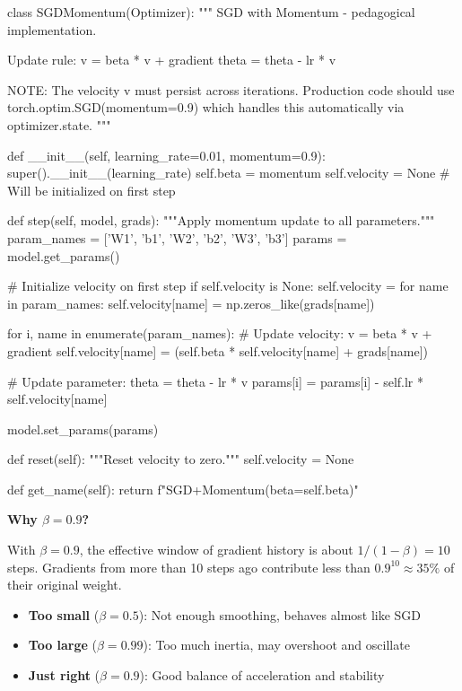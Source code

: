 \documentclass[../../main.tex]{subfiles}
\begin{document}
\begin{pythoncode}
class SGDMomentum(Optimizer):
    """
    SGD with Momentum - pedagogical implementation.

    Update rule:
        v = beta * v + gradient
        theta = theta - lr * v

    NOTE: The velocity v must persist across iterations.
    Production code should use torch.optim.SGD(momentum=0.9)
    which handles this automatically via optimizer.state.
    """

    def __init__(self, learning_rate=0.01, momentum=0.9):
        super().__init__(learning_rate)
        self.beta = momentum
        self.velocity = None  # Will be initialized on first step

    def step(self, model, grads):
        """Apply momentum update to all parameters."""
        param_names = ['W1', 'b1', 'W2', 'b2', 'W3', 'b3']
        params = model.get_params()

        # Initialize velocity on first step
        if self.velocity is None:
            self.velocity = {}
            for name in param_names:
                self.velocity[name] = np.zeros_like(grads[name])

        for i, name in enumerate(param_names):
            # Update velocity: v = beta * v + gradient
            self.velocity[name] = (self.beta * self.velocity[name] +
                                   grads[name])

            # Update parameter: theta = theta - lr * v
            params[i] = params[i] - self.lr * self.velocity[name]

        model.set_params(params)

    def reset(self):
        """Reset velocity to zero."""
        self.velocity = None

    def get_name(self):
        return f"SGD+Momentum(beta={self.beta})"
\end{pythoncode}

\begin{intuition}
\textbf{Why $\beta = 0.9$?}

With $\beta = 0.9$, the effective window of gradient history is about $1/(1-\beta) = 10$ steps. Gradients from more than 10 steps ago contribute less than $0.9^{10} \approx 35\%$ of their original weight.

\begin{itemize}
    \item \textbf{Too small} ($\beta = 0.5$): Not enough smoothing, behaves almost like SGD
    \item \textbf{Too large} ($\beta = 0.99$): Too much inertia, may overshoot and oscillate
    \item \textbf{Just right} ($\beta = 0.9$): Good balance of acceleration and stability
\end{itemize}
\end{intuition}
\end{document}
